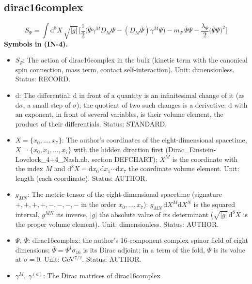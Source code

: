 \documentclass[
  10pt,
]{article}
\providecommand{\tightlist}{%
  \setlength{\itemsep}{0pt}\setlength{\parskip}{0pt}}
\begin{document}
\hypertarget{dirac16complex}{%
\subsection{dirac16complex}\label{dirac16complex}}

\[
S_\Psi = \int\mathrm{d}^8X\,\sqrt{\lvert g\rvert}\,\Big[\frac12\big(\bar\Psi\gamma^MD_M\Psi - (D_M\bar\Psi)\gamma^M\Psi\big)
 - m_\Psi\,\bar\Psi\Psi - \frac{\lambda_\Psi}{2}\big(\bar\Psi\Psi\big)^2\Big] \tag{IN-4}
\] \textbf{Symbols in (IN-4).}

\begin{itemize}
\tightlist
\item
  \(S_\Psi\): The action of dirac16complex in the bulk (kinetic term
  with the canonical spin connection, mass term, contact
  self-interaction). Unit: dimensionless. Status: RECORD.
\item
  \(\mathrm{d}\): The differential: \(\mathrm{d}\) in front of a
  quantity is an infinitesimal change of it (as \(\mathrm{d}\sigma\), a
  small step of \(\sigma\)); the quotient of two such changes is a
  derivative; \(\mathrm{d}\) with an exponent, in front of several
  variables, is their volume element, the product of their
  differentials. Status: STANDARD.
\item
  \(X = \{x_0, \dots, x_7\}\): The author's coordinates of the
  eight-dimensional spacetime, \(X = \{x_0, x_1, \dots, x_7\}\) with the
  hidden direction first (Dirac\_Einstein-Lovelock\_4+4\_Nash.nb,
  section DEFCHART); \(X^M\) is the coordinate with the index \(M\) and
  \(\mathrm{d}^8X = \mathrm{d}x_0\,\mathrm{d}x_1\cdots\mathrm{d}x_7\)
  the coordinate volume element. Unit: length (each coordinate). Status:
  AUTHOR.
\item
  \(g_{MN}\): The metric tensor of the eight-dimensional spacetime
  (signature \(+,+,+,+,-,-,-,-\) in the order \(x_0, \dots, x_7\)):
  \(g_{MN}\,\mathrm{d}X^M\mathrm{d}X^N\) is the squared interval,
  \(g^{MN}\) its inverse, \(\lvert g\rvert\) the absolute value of its
  determinant (\(\sqrt{\lvert g\rvert}\,\mathrm{d}^8X\) is the proper
  volume element). Unit: dimensionless. Status: AUTHOR.
\item
  \(\Psi,\ \bar\Psi\): dirac16complex: the author's 16-component complex
  spinor field of eight dimensions;
  \(\bar\Psi = \Psi^\dagger\sigma_{16}\) is its Dirac adjoint; in a term
  of the fold, \(\Psi\) is its value at \(\sigma = 0\). Unit:
  GeV\(^{7/2}\). Status: AUTHOR.
\item
  \(\gamma^M,\ \gamma^{(a)}\): The Dirac matrices of dirac16complex

\end{itemize}
\end{document}
